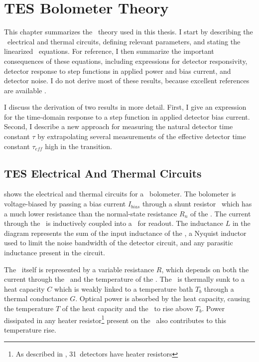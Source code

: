 \chapter{\textsc{TES} Bolometer Theory}\label{c:tes}


This chapter summarizes the \TES\ theory used in this thesis.
I start by describing the \TES\ electrical and thermal circuits, defining relevant parameters, and stating the linearized \TES\ equations.
For reference, I then summarize the important consequences of these equations, including expressions for detector responsivity, detector response to step functions in applied power and bias current, and detector noise.
I do not derive most of these results, because excellent references are available \cite{irwin_application_1995,irwin_transition-edge_2005, mather_bolometer_1982}.

I discuss the derivation of two results in more detail.
First, I give an expression for the time-domain response to a step function in applied detector bias current.
Second, I describe a new approach for measuring the natural detector time constant $\tau$ by extrapolating several measurements of the effective detector time constant $\tau_{eff}$ high in the transition. 

\section{\textsc{TES} Electrical And Thermal Circuits} \label{sec:ch3-circuits}

 shows the electrical and thermal circuits for a \TES\ bolometer.
The bolometer is voltage-biased by passing a bias current $I_{bias}$ through a shunt resistor \Rsh\ which has a much lower resistance than the normal-state resistance $R_n$ of the \TES.
The current through the \TES\ is inductively coupled into a \SQUID\ for readout.
The inductance $L$ in the diagram represents the sum of the input inductance of the \SQUID, a Nyquist inductor used to limit the noise bandwidth of the detector circuit, and any parasitic inductance present in the circuit.

The \TES\ itself is represented by a variable resistance $R$, which depends on both the current through the \TES\ and the temperature of the \TES.
The \TES\ is thermally sunk to a heat capacity $C$ which is weakly linked to a temperature bath $T_b$ through a thermal conductance $G$.
Optical power is absorbed by the heat capacity, causing the temperature $T$ of the heat capacity and the \TES\ to rise above $T_b$.
Power dissipated in any heater resistor\footnote{As described in , 31~detectors have heater resistors} present on the \TES\ also contributes to this temperature rise.

